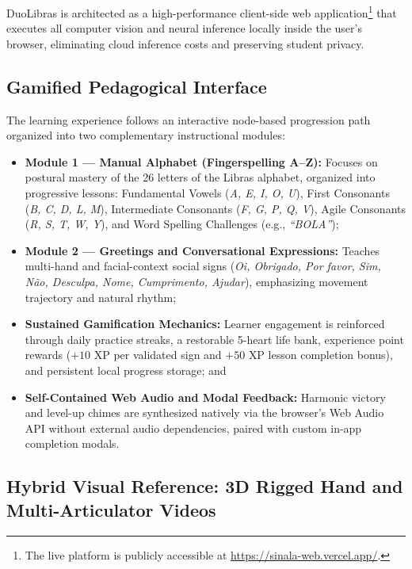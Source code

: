 \documentclass[12pt,a4paper]{article}
\begin{document}
DuoLibras is architected as a high-performance client-side web application\footnote{The live platform is publicly accessible at \url{https://sinala-web.vercel.app/}.} that executes all computer vision and neural inference locally inside the user's browser, eliminating cloud inference costs and preserving student privacy.

\subsection{Gamified Pedagogical Interface}

The learning experience follows an interactive node-based progression path organized into two complementary instructional modules:

\begin{itemize}
    \item \textbf{Module 1 --- Manual Alphabet (Fingerspelling A--Z):} Focuses on postural mastery of the 26 letters of the Libras alphabet, organized into progressive lessons: Fundamental Vowels (\textit{A, E, I, O, U}), First Consonants (\textit{B, C, D, L, M}), Intermediate Consonants (\textit{F, G, P, Q, V}), Agile Consonants (\textit{R, S, T, W, Y}), and Word Spelling Challenges (e.g., \textit{``BOLA''});

    \item \textbf{Module 2 --- Greetings and Conversational Expressions:} Teaches multi-hand and facial-context social signs (\textit{Oi, Obrigado, Por favor, Sim, N\~ao, Desculpa, Nome, Cumprimento, Ajudar}), emphasizing movement trajectory and natural rhythm;

    \item \textbf{Sustained Gamification Mechanics:} Learner engagement is reinforced through daily practice streaks, a restorable 5-heart life bank, experience point rewards ($+10\text{ XP}$ per validated sign and $+50\text{ XP}$ lesson completion bonus), and persistent local progress storage; and

    \item \textbf{Self-Contained Web Audio and Modal Feedback:} Harmonic victory and level-up chimes are synthesized natively via the browser's Web Audio API without external audio dependencies, paired with custom in-app completion modals.
\end{itemize}

\subsection{Hybrid Visual Reference: 3D Rigged Hand and Multi-Articulator Videos}
\end{document}
